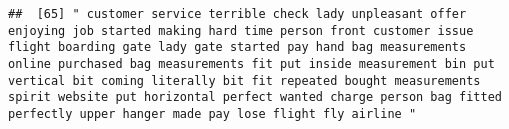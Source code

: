 \documentclass[
]{article}
\begin{document}
\begin{verbatim}
##  [65] " customer service terrible check lady unpleasant offer enjoying job started making hard time person front customer issue flight boarding gate lady gate started pay hand bag measurements online purchased bag measurements fit put inside measurement bin put vertical bit coming literally bit fit repeated bought measurements spirit website put horizontal perfect wanted charge person bag fitted perfectly upper hanger made pay lose flight fly airline "                                                                                                                                                                                                                                                                                                                                                                                                                                                                                                                                                                                                                                                                                                                                                                                                                                                                                                                                                                                                                                                                                                                                                                                                                                                                                                                              

\end{verbatim}
\end{document}
